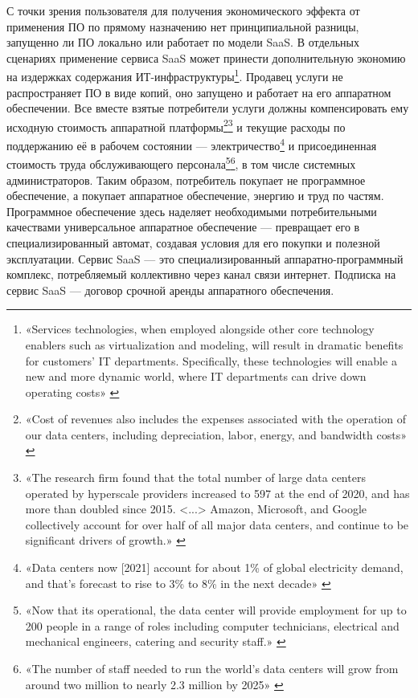 \documentclass{article}
\begin{document}
С точки зрения пользователя для получения экономического эффекта от применения ПО по прямому назначению нет принципиальной разницы, запущенно ли ПО локально или работает по модели SaaS. В отдельных сценариях применение сервиса SaaS может принести дополнительную экономию на издержках содержания ИТ-инфраструктуры\footnote{«Services technologies, when employed alongside other core technology enablers such as virtualization and modeling, will result in dramatic benefits for customers’ IT departments. Specifically, these technologies will enable a new and more dynamic world, where IT departments can drive down operating costs» \cite{microsoftAzureAnnounce2008}}. Продавец услуги не распространяет ПО в виде копий, оно запущено и работает на его аппаратном обеспечении. Все вместе взятые потребители услуги должны компенсировать ему исходную стоимость аппаратной платформы\footnote{«Cost of revenues also includes the expenses associated with the operation of our data centers, including depreciation, labor, energy, and bandwidth costs» \cite{google10K2009}}\footnote{«The research firm found that the total number of large data centers operated by hyperscale providers increased to 597 at the end of 2020, and has more than doubled since 2015. <...> Amazon, Microsoft, and Google collectively account for over half of all major data centers, and continue to be significant drivers of growth.» \cite{dataCenters2021}} и текущие расходы по поддержанию её в рабочем состоянии — электричество\footnote{«Data centers now [2021] account for about 1\% of global electricity demand, and that’s forecast to rise to 3\% to 8\% in the next decade» \cite{saasEnegry2021}} и присоединенная стоимость труда обслуживающего персонала\footnote{«Now that its operational, the data center will provide employment for up to 200 people in a range of roles including computer technicians, electrical and mechanical engineers, catering and security staff.» \cite{googleDutchDataCenter2016}}\footnote{«The number of staff needed to run the world's data centers will grow from around two million to nearly 2.3 million by 2025» \cite{dataCentersNeedStaff2021}}, в том числе системных администраторов. Таким образом, потребитель покупает не программное обеспечение, а покупает аппаратное обеспечение, энергию и труд по частям. Программное обеспечение здесь наделяет необходимыми потребительными качествами универсальное аппаратное обеспечение — превращает его в специализированный автомат, создавая условия для его покупки и полезной эксплуатации. Сервис SaaS — это специализированный аппаратно-программный комплекс, потребляемый коллективно через канал связи интернет. Подписка на сервис SaaS — договор срочной аренды аппаратного обеспечения.
\end{document}
